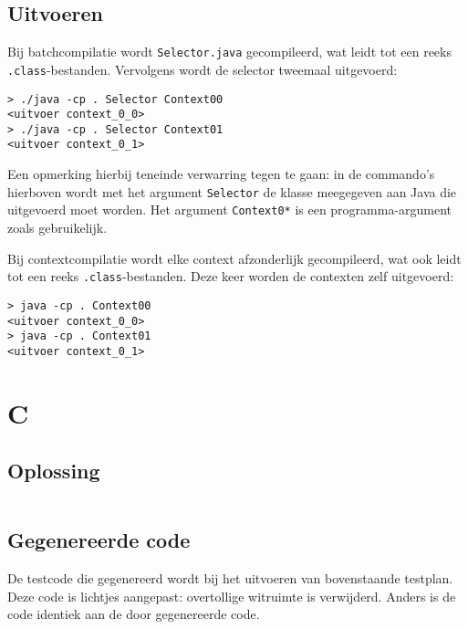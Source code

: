 \inputminted{java}{sources/echo/Selector.java}

\subsection{Uitvoeren}\label{subsec:echo-java-uitvoeren}

Bij batchcompilatie wordt \texttt{Selector.java} gecompileerd, wat leidt tot een reeks \texttt{.class}-bestanden.
Vervolgens wordt de selector tweemaal uitgevoerd:

\begin{verbatim}
> ./java -cp . Selector Context00
<uitvoer context_0_0>
> ./java -cp . Selector Context01
<uitvoer context_0_1>
\end{verbatim}

Een opmerking hierbij teneinde verwarring tegen te gaan: in de commando's hierboven wordt met het argument \texttt{Selector} de klasse meegegeven aan Java die uitgevoerd moet worden.
Het argument \texttt{Context0*} is een programma-argument zoals gebruikelijk.

Bij contextcompilatie wordt elke context afzonderlijk gecompileerd, wat ook leidt tot een reeks \texttt{.class}-bestanden.
Deze keer worden de contexten zelf uitgevoerd:

\begin{verbatim}
> java -cp . Context00
<uitvoer context_0_0>
> java -cp . Context01
<uitvoer context_0_1>
\end{verbatim}

\section{C}\label{sec:echo-c}

\subsection{Oplossing}\label{subsec:echo-c-oplossing}

\inputminted{c}{sources/echo/correct.c}

\subsection{Gegenereerde code}\label{subsec:echo-c-gegenereerde-code}

De testcode die gegenereerd wordt bij het uitvoeren van bovenstaande testplan.
Deze code is lichtjes aangepast: overtollige witruimte is verwijderd.
Anders is de code identiek aan de door \tested{} gegenereerde code.

